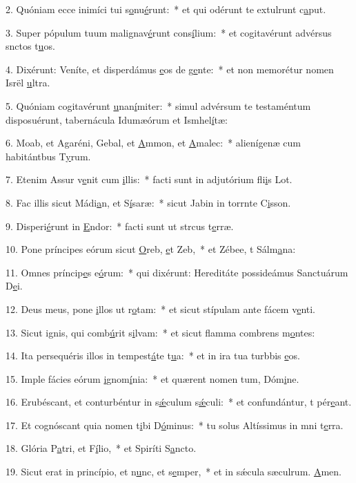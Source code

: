 2. Quóniam ecce inimíci tui s\uline{o}nu\uline{é}runt:~* et qui odérunt te extulrunt c\uline{a}put.\par 
3. Super pópulum tuum malignav\uline{é}runt cons\uline{í}lium:~* et cogitavérunt advérsus snctos t\uline{u}os.\par 
4. Dixérunt: Veníte, et disperdámus \uline{e}os de g\uline{e}nte:~* et non memorétur nomen Isrël \uline{u}ltra.\par 
5. Quóniam cogitavérunt \uline{u}nan\uline{í}miter:~* simul advérsum te testaméntum disposuérunt, tabernácula Idumæórum et Ismhel\uline{í}tæ:\par 
6. Moab, et Agaréni, Gebal, et \uline{A}mmon, et \uline{A}malec:~* alienígenæ cum habitántbus T\uline{y}rum.\par 
7. Etenim Assur v\uline{e}nit cum \uline{i}llis:~* facti sunt in adjutórium fli\uline{i}s Lot.\par 
8. Fac illis sicut Mádi\uline{a}n, et S\uline{í}saræ:~* sicut Jabin in torrnte C\uline{i}sson.\par 
9. Disperi\uline{é}runt in \uline{E}ndor:~* facti sunt ut strcus t\uline{e}rræ.\par 
10. Pone príncipes eórum sicut \uline{O}reb, \uline{e}t Zeb,~* et Zébee, t Sálm\uline{a}na:\par 
11. Omnes príncip\uline{e}s e\uline{ó}rum:~* qui dixérunt: Hereditáte possideámus Sanctuárum D\uline{e}i.\par 
12. Deus meus, pone \uline{i}llos ut r\uline{o}tam:~* et sicut stípulam ante fácem v\uline{e}nti.\par 
13. Sicut ignis, qui comb\uline{ú}rit s\uline{i}lvam:~* et sicut flamma combrens m\uline{o}ntes:\par 
14. Ita persequéris illos in tempest\uline{á}te t\uline{u}a:~* et in ira tua turbbis \uline{e}os.\par 
15. Imple fácies eórum \uline{i}gnom\uline{í}nia:~* et quærent nomen tum, Dóm\uline{i}ne.\par 
16. Erubéscant, et conturbéntur in s\uline{ǽ}culum s\uline{ǽ}culi:~* et confundántur, t pér\uline{e}ant.\par 
17. Et cognóscant quia nomen t\uline{i}bi D\uline{ó}minus:~* tu solus Altíssimus in mni t\uline{e}rra.\par 
18. Glória P\uline{a}tri, et F\uline{í}lio,~* et Spiríti S\uline{a}ncto.\par 
19. Sicut erat in princípio, et n\uline{u}nc, et s\uline{e}mper,~* et in sǽcula sæculrum. \uline{A}men.\par 
